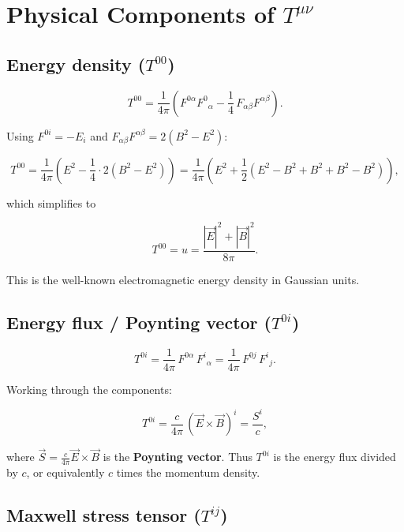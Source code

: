 \section{Physical Components of $T^{\mu\nu}$}

\subsection{Energy density ($T^{00}$)}

\begin{equation}
T^{00} = \frac{1}{4\pi}\!\left(F^{0\alpha}F^{0}{}_\alpha - \frac{1}{4}\,F_{\alpha\beta}F^{\alpha\beta}\right).
\end{equation}

Using $F^{0i} = -E_i$ and $F_{\alpha\beta}F^{\alpha\beta} = 2(B^2 - E^2)$:

\begin{equation}
T^{00} = \frac{1}{4\pi}\!\left(E^2 - \frac{1}{4}\cdot 2(B^2 - E^2)\right) = \frac{1}{4\pi}\!\left(E^2 + \frac{1}{2}(E^2 - B^2 + B^2 + B^2 - B^2)\right),
\end{equation}

which simplifies to

\begin{equation}
\boxed{T^{00} = u = \frac{|\vec{E}|^2 + |\vec{B}|^2}{8\pi}.}
\end{equation}

This is the well-known electromagnetic energy density in Gaussian units.

\subsection{Energy flux / Poynting vector ($T^{0i}$)}

\begin{equation}
T^{0i} = \frac{1}{4\pi}\,F^{0\alpha}\,F^{i}{}_\alpha = \frac{1}{4\pi}\,F^{0j}\,F^{i}{}_j.
\end{equation}

Working through the components:

\begin{equation}
\boxed{T^{0i} = \frac{c}{4\pi}\,(\vec{E}\times\vec{B})^i = \frac{S^i}{c},}
\end{equation}

where $\vec{S} = \frac{c}{4\pi}\vec{E}\times\vec{B}$ is the \textbf{Poynting vector}. Thus $T^{0i}$ is the energy flux divided by $c$, or equivalently $c$ times the momentum density.

\subsection{Maxwell stress tensor ($T^{ij}$)}

